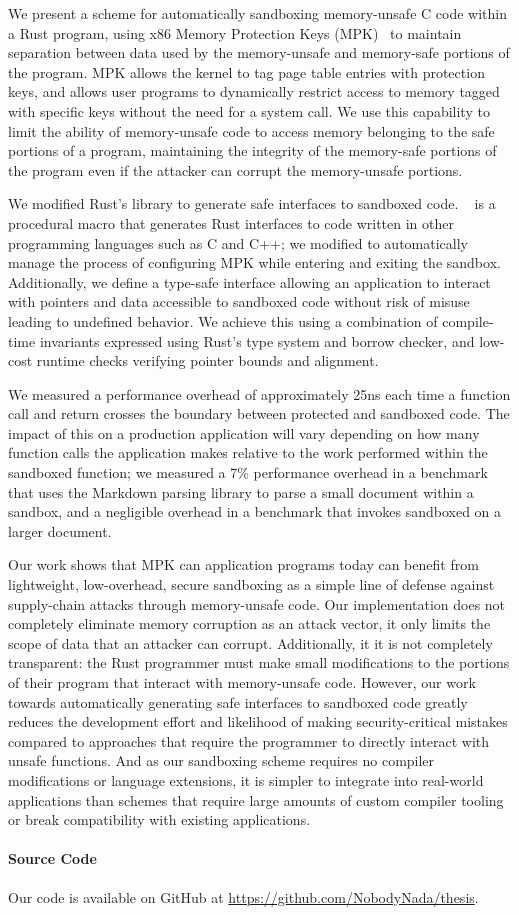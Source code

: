 We present a scheme for automatically sandboxing memory-unsafe C code within a Rust program, using
x86 Memory Protection Keys (MPK)~\cite{intel:system, linux:mpk} to maintain separation between data
used by the memory-unsafe and memory-safe portions of the program. MPK allows the kernel to tag page
table entries with protection keys, and allows user programs to dynamically restrict access to
memory tagged with specific keys without the need for a system call. We use this capability to limit
the ability of memory-unsafe code to access memory belonging to the safe portions of a program,
maintaining the integrity of the memory-safe portions of the program even if the attacker can
corrupt the memory-unsafe portions.

We modified Rust's  library to generate safe interfaces to sandboxed code.
~\cite{rust:bindgen} is a procedural macro that generates Rust interfaces to code
written in other programming languages such as C and C++; we modified  to automatically
manage the process of configuring MPK while entering and exiting the sandbox. Additionally, we
define a type-safe interface allowing an application to interact with pointers and data accessible
to sandboxed code without risk of misuse leading to undefined behavior. We achieve this using a
combination of compile-time invariants expressed using Rust's type system and borrow checker, and
low-cost runtime checks verifying pointer bounds and alignment.

We measured a performance overhead of approximately 25ns each time a function call and return
crosses the boundary between protected and sandboxed code. The impact of this on a production
application will vary depending on how many function calls the application makes relative to the
work performed within the sandboxed function; we measured a 7\% performance overhead in a benchmark
that uses the  Markdown parsing library to parse a small document within a sandbox, and a
negligible overhead in a benchmark that invokes sandboxed  on a larger document.

Our work shows that MPK can application programs today can benefit from lightweight, low-overhead,
secure sandboxing as a simple line of defense against supply-chain attacks through memory-unsafe
code. Our implementation does not completely eliminate memory corruption as an attack vector, it
only limits the scope of data that an attacker can corrupt. Additionally, it it is not completely
transparent: the Rust programmer must make small modifications to the portions of their program that
interact with memory-unsafe code. However, our work towards automatically generating safe interfaces
to sandboxed code greatly reduces the development effort and likelihood of making security-critical
mistakes compared to approaches that require the programmer to directly interact with unsafe
functions. And as our sandboxing scheme requires no compiler modifications or language extensions,
it is simpler to integrate into real-world applications than schemes that require large amounts of
custom compiler tooling or break compatibility with existing applications.

\paragraph{Source Code} Our code is available on GitHub at
\url{https://github.com/NobodyNada/thesis}.
